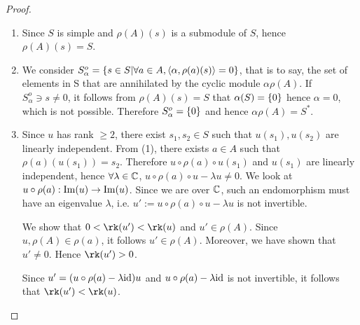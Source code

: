 \documentclass[twoside = false,	%
		headsepline,		%
		parskip = true,
		]{scrbook}						%
\begin{document}
    \begin{proof}
    \begin{enumerate}
        \item Since $S$ is simple and $\rho(A)(s)$ is a submodule of $S$, hence $\rho(A)(s)=S$.
        \item We consider $S^o_\alpha = \left\{  s\in S | \forall a \in A, \left\langle \alpha, \rho(a)(s)\right\rangle = 0\right\}$, that is to say, the set of elements in S that are annihilated by the cyclic module $\alpha \rho(A)$. If $S_\alpha^o\ni s \neq 0$, it follows from $\rho(A)(s)=S$ that $\alpha(S)=\left\{ 0\right\}$ hence $\alpha = 0$, which is not possible. Therefore $S_\alpha^o = \left\{ 0\right\}$ and hence $\alpha \rho(A) = S^*$.
        \item Since $u$ has rank $\geq 2$, there exist $s_1, s_2 \in S$ such that $u(s_1), u(s_2)$ are linearly independent. From (1), there exists $a\in A$ such that $\rho(a)(u(s_1))=s_2$. Therefore $u \circ \rho(a) \circ u(s_1)$ and $u(s_1)$ are linearly independent, hence $\forall \lambda \in \mathbb C$, $u\circ\rho(a)\circ u - \lambda u\neq 0$. We look at $u \circ \rho(a): \mathrm{Im}(u) \to \mathrm{Im} (u)$. Since we are over $\mathbb C$, such an endomorphism must have an eigenvalue $\lambda$, i.e. $u':= u\circ \rho(a)\circ u -\lambda u$ is not invertible.
        
        We show that $0<\rk(u') < \rk(u)$ and $u'\in \rho(A)$.
        Since $u, \rho(A)\in \rho(a)$, it follows $u'\in \rho(A)$. Moreover, we have shown that $u'\neq 0$. Hence $\rk(u')> 0$.
        
        Since $u'=(u\circ \rho(a)-\lambda\mathrm{id})u$ and $u\circ \rho(a) - \lambda \mathrm{id}$ is not invertible, it follows that $\rk(u')< \rk(u)$.
    \end{enumerate}
    \end{proof}
    
\end{document}

